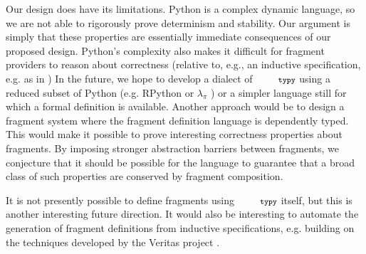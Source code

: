 \documentclass[10pt]{sigplanconf}
\newcommand{\typy}{\texttt{\footnotesize typy}}
\begin{document}

Our design does have its limitations. Python is a complex dynamic language, so we are not able to rigorously prove determinism and stability. Our argument is simply that these properties are essentially immediate consequences of our proposed design. Python's complexity also makes it difficult for fragment providers to reason about correctness (relative to, e.g., an inductive specification, e.g. as in \cite{sanitation-psp14})  
In the future, we hope to develop a dialect of $\typy$ using a reduced subset of Python (e.g. RPython \cite{ancona2007rpython} or $\lambda_\pi$ \cite{Politz:2013:PFM:2509136.2509536}) or a simpler language still for which a formal definition is available. Another approach would be to design a fragment system where the fragment definition language is dependently typed. This would make it possible to prove interesting correctness properties about fragments. By imposing stronger abstraction barriers between fragments, we conjecture that it should be possible for the language to guarantee that a broad class of such properties are conserved by fragment composition.

It is not presently possible to define fragments using $\typy$ itself, but this is another interesting future direction. It would also be interesting to automate the generation of fragment definitions from inductive specifications, e.g. building on the techniques developed by the Veritas project \cite{grewe2015type}. 


\end{document}
